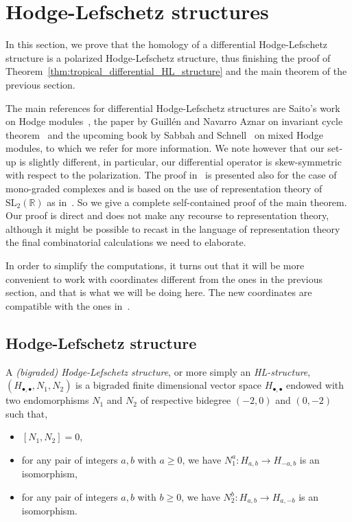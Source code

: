 \documentclass[11pt]{amsart}
\theoremstyle{definition}
\newenvironment{defi}
  {\pushQED{\qed}\renewcommand{\qedsymbol}{$\diamond$}\defii}
  {\popQED\enddefii}
\numberwithin{equation}{section}
\renewcommand{\~}{\widetilde}
\newcommand{\R}{\mathbb{R}}
\newcommand{\bul}{\bullet} %
\begin{document}

\section{Hodge-Lefschetz structures}
\label{sec:differential_HL_structure}

In this section, we prove that the homology of a differential Hodge-Lefschetz structure is a polarized Hodge-Lefschetz structure, thus finishing the proof of Theorem~\ref{thm:tropical_differential_HL_structure} and the main theorem of the previous section.

\medskip

The main references for differential Hodge-Lefschetz structures are Saito's work on Hodge modules~\cite{Saito}, the paper by Guill\'en and Navarro Aznar on invariant cycle theorem~\cite{GNA90} and the upcoming book by Sabbah and Schnell~\cite{SabSch} on mixed Hodge modules, to which we refer for more information. We note however that our set-up is slightly different, in particular, our differential operator is skew-symmetric with respect to the polarization. The proof in~\cite{SabSch} is presented also for the case of mono-graded complexes and is based on the use of representation theory of $\mathrm{SL}_2(\R)$ as in~\cite{GNA90}. So we give a complete self-contained proof of the main theorem. Our proof is direct and does not make any recourse to representation theory, although it might be possible to recast in the language of representation theory the final combinatorial calculations we need to elaborate.

\medskip

In order to simplify the computations, it turns out that it will be more convenient to work with coordinates different from the ones in the previous section, and that is what we will be doing here. The new coordinates are compatible with the ones in~\cite{SabSch}.



\subsection{Hodge-Lefschetz structure}

\begin{defi} \label{defi:HL-structure}
A \emph{(bigraded) Hodge-Lefschetz structure}, or more simply an \emph{HL-structure}, $(H_{\bul,\bul}, N_1, N_2)$ is a bigraded finite dimensional vector space $H_{\bul,\bul}$ endowed with two endomorphisms $N_1$ and $N_2$ of respective bidegree $(-2,0)$ and $(0,-2)$ such that,
\begin{itemize}
\item $[N_1,N_2]=0$,
\item for any pair of integers $a,b$ with $a\geq 0$, we have $N_1^a\colon H_{a,b}\to H_{-a,b}$ is an isomorphism,
\item for any pair of integers $a, b$ with $b\geq0$, we have $N_2^b\colon H_{a,b}\to H_{a,-b}$ is an isomorphism.
\end{itemize}
\end{defi}
\end{document}
